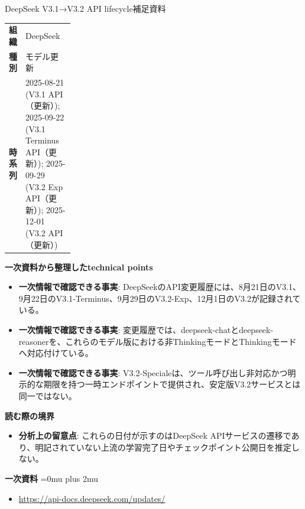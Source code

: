 \begin{technicalnote}{DeepSeek V3.1→V3.2 API lifecycle}{補足資料}
\begingroup
\begin{tabularx}{\linewidth}{@{}>{\bfseries}p{0.22\linewidth}X@{}}
組織 & DeepSeek \\
種別 & モデル更新 \\
時系列 & 2025-08-21 (V3.1 API（更新）); 2025-09-22 (V3.1 Terminus API（更新）); 2025-09-29 (V3.2 Exp API（更新）); 2025-12-01 (V3.2 API（更新）) \\
\end{tabularx}
\smallskip
{\bfseries 一次資料から整理したtechnical points}
\begin{itemize}[leftmargin=1.5em,itemsep=0.35em]
\item \textbf{一次情報で確認できる事実}: DeepSeekのAPI変更履歴には、8月21日のV3.1、9月22日のV3.1-Terminus、9月29日のV3.2-Exp、12月1日のV3.2が記録されている。
\item \textbf{一次情報で確認できる事実}: 変更履歴では、deepseek-chatとdeepseek-reasonerを、これらのモデル版における非ThinkingモードとThinkingモードへ対応付けている。
\item \textbf{一次情報で確認できる事実}: V3.2-Specialeは、ツール呼び出し非対応かつ明示的な期限を持つ一時エンドポイントで提供され、安定版V3.2サービスとは同一ではない。
\end{itemize}
\begin{minipage}{\linewidth}
{\bfseries 読む際の境界}
\begin{itemize}[leftmargin=1.5em,itemsep=0.35em]
\item \textbf{分析上の留意点}: これらの日付が示すのはDeepSeek APIサービスの遷移であり、明記されていない上流の学習完了日やチェックポイント公開日を推定しない。
\end{itemize}
\begin{samepage}
{\bfseries 一次資料}
\begingroup\sloppy
\Urlmuskip=0mu plus 2mu\relax
\begin{itemize}[leftmargin=1.5em,itemsep=0.25em]
\item {\scriptsize\url{https://api-docs.deepseek.com/updates/}}
\end{itemize}
\endgroup
\end{samepage}
\end{minipage}
\endgroup
\end{technicalnote}
\medskip

